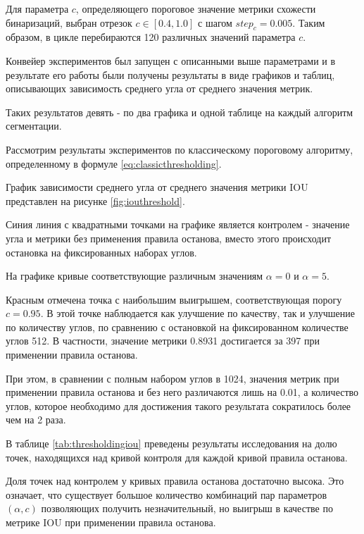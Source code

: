 Для параметра \(c\), определяющего пороговое значение метрики схожести бинаризаций, выбран отрезок \(c \in [0.4, 1.0]\) с шагом \(step_c = 0.005\). Таким образом, в цикле перебираются 120 различных значений параметра \(c\).

Конвейер экспериментов был запущен с описанными выше параметрами и в результате его работы были получены результаты в виде графиков и таблиц, описывающих зависимость среднего угла от среднего значения метрик. 

Таких результатов девять - по  два графика и одной таблице на каждый алгоритм сегментации.

Рассмотрим результаты экспериментов по классическому пороговому алгоритму, определенному в формуле \ref*{eq:classicthresholding}.

График зависимости среднего угла от среднего значения метрики IOU представлен на рисунке \ref*{fig:iouthreshold}.


Синия линия с квадратными точками на графике является контролем - значение угла и метрики без применения правила останова, вместо этого происходит остановка на фиксированных наборах углов.

На графике кривые соответствующие различным значениям \(\alpha = 0\) и \(\alpha = 5\). 

Красным отмечена точка с наибольшим выигрышем, соответствующая порогу \(c = 0.95\). В этой точке наблюдается как улучшение по качеству, так и улучшение по количеству углов, по сравнению с остановкой на фиксированном количестве углов 512. В частности, значение метрики 0.8931 достигается за 397 при применении правила останова.

При этом, в сравнении с полным набором углов в 1024, значения метрик при применении правила останова и без него различаются лишь на 0.01, а количество углов, которое необходимо для достижения такого результата сократилось более чем на 2 раза.

В таблице \ref*{tab:thresholdingiou} преведены результаты исследования на долю точек, находящихся над кривой контроля для каждой кривой правила останова.

Доля точек над контролем у кривых правила останова достаточно высока. Это означает, что существует большое количество комбинаций пар параметров \((\alpha, c)\) позволяющих получить незначительный, но выигрыш в качестве по метрике IOU при применении правила останова. 

